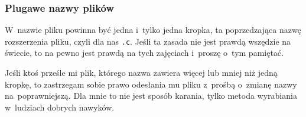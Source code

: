 \documentclass[10pt,t]{beamer}
\begin{document}
\begin{frame}
  \frametitle{Plugawe nazwy plików}


  W~nazwie pliku powinna być \alert{jedna i~tylko jedna kropka}, ta
  poprzedzająca nazwę rozszerzenia pliku, czyli dla nas \texttt{.c}.
  Jeśli ta zasada nie jest prawdą wszędzie na świecie, to na pewno jest
  prawdą na tych zajęciach i~proszę o~tym pamiętać.

  Jeśli ktoś prześle mi plik, którego nazwa zawiera więcej lub mniej niż
  \alert{jedną} kropkę, to zastrzegam sobie prawo odesłania mu pliku
  z~prośbą o~zmianę nazwy na~poprawniejszą. Dla mnie to nie jest sposób
  karania, tylko metoda wyrabiania w~ludziach dobrych nawyków.

\end{frame}










































\printbibliography





\end{document}
